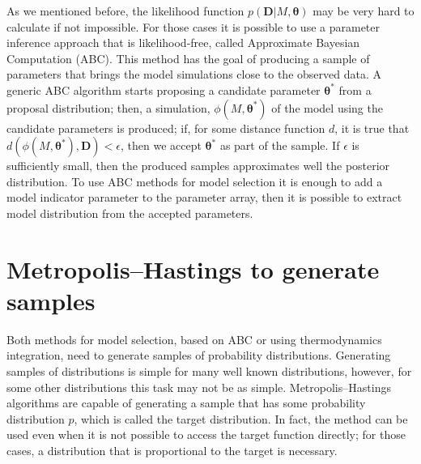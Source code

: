 As we mentioned before, the likelihood function 
$p({\bm D} | M, {\bm \theta})$ may be very hard to calculate if not 
impossible. For those cases it is possible to use a parameter inference
approach that is likelihood-free, called Approximate Bayesian 
Computation (ABC). This method has the goal of producing a sample of 
parameters that brings the model simulations close to the observed data.
A generic ABC algorithm starts proposing a candidate parameter 
${\bm \theta}^*$ from a proposal distribution; then, a simulation, 
$\phi (M, {\bm \theta}^*)$ of the model using the candidate parameters
is produced; if, for some distance function $d$, it is true that 
$d(\phi(M, {\bm \theta}^*), {\bm D}) < \epsilon$, then we accept 
${\bm \theta}^*$ as part of the sample. If $\epsilon$ is sufficiently 
small, then the produced samples approximates well the posterior 
distribution. To use ABC methods for model selection it is enough to add
a model indicator parameter to the parameter array, then it is possible
to extract model distribution from the accepted parameters.

\section{Metropolis--Hastings to generate samples}
Both methods for model selection, based on ABC or using thermodynamics
integration, need to generate samples of probability distributions. 
Generating samples of distributions is simple for many well known 
distributions, however, for some other distributions this task may not 
be as simple. Metropolis--Hastings algorithms are capable of generating a 
sample that has some probability distribution $p$, which is called the 
target distribution. In fact, the method can be used even when it is not
possible to access the target function directly; for those cases, a 
distribution that is proportional to the target is necessary.

